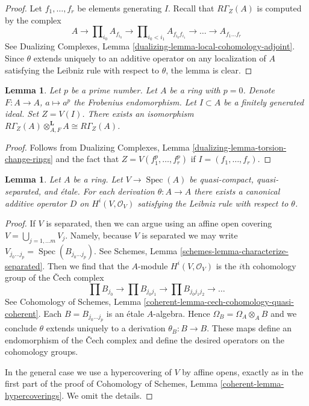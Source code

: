 \documentclass{stacks-project}
\theoremstyle{plain}
\newtheorem{lemma}[subsection]{Lemma}
\theoremstyle{definition}
\theoremstyle{remark}
\numberwithin{equation}{subsection}
\def\Spec{\mathop{\mathrm{Spec}}}
\begin{document}
\begin{proof}
Let $f_1, \ldots, f_r$ be elements generating $I$.
Recall that $R\Gamma_Z(A)$ is computed by the complex
$$
A \to \prod\nolimits_{i_0} A_{f_{i_0}} \to
\prod\nolimits_{i_0 < i_1} A_{f_{i_0}f_{i_1}}
\to \ldots \to A_{f_1\ldots f_r}
$$
See Dualizing Complexes, Lemma \ref{dualizing-lemma-local-cohomology-adjoint}.
Since $\theta$ extends uniquely to an additive operator on
any localization of $A$ satisfying the Leibniz rule with
respect to $\theta$, the lemma is clear.
\end{proof}

\begin{lemma}
\label{lemma-frobenius}
Let $p$ be a prime number. Let $A$ be a ring with $p = 0$.
Denote $F : A \to A$, $a \mapsto a^p$ the Frobenius endomorphism.
Let $I \subset A$ be a finitely generated ideal. Set $Z = V(I)$.
There exists an isomorphism
$R\Gamma_Z(A) \otimes_{A, F}^\mathbf{L} A \cong R\Gamma_Z(A)$.
\end{lemma}

\begin{proof}
Follows from Dualizing Complexes, Lemma
\ref{dualizing-lemma-torsion-change-rings}
and the fact that $Z = V(f_1^p, \ldots, f_r^p)$
if $I = (f_1, \ldots, f_r)$.
\end{proof}

\begin{lemma}
\label{lemma-etale-derivation}
Let $A$ be a ring. Let $V \to \Spec(A)$ be quasi-compact, quasi-separated,
and \'etale. For each derivation $\theta : A \to A$ there exists a canonical
additive operator $D$ on $H^i(V, \mathcal{O}_V)$
satisfying the Leibniz rule with respect to $\theta$.
\end{lemma}

\begin{proof}
If $V$ is separated, then we can argue using an affine open covering
$V = \bigcup_{j = 1, \ldots m} V_j$. Namely, because $V$ is separated
we may write $V_{j_0 \ldots j_p} = \Spec(B_{j_0 \ldots j_p})$.
See Schemes, Lemma \ref{schemes-lemma-characterize-separated}. Then we
find that the $A$-module $H^i(V, \mathcal{O}_V)$
is the $i$th cohomology group of the {\v C}ech complex
$$
\prod B_{j_0} \to
\prod B_{j_0j_1} \to
\prod B_{j_0j_1j_2} \to \ldots
$$
See Cohomology of Schemes, Lemma
\ref{coherent-lemma-cech-cohomology-quasi-coherent}.
Each $B = B_{j_0 \ldots j_p}$ is an \'etale $A$-algebra.
Hence $\Omega_B = \Omega_A \otimes_A B$ and we conclude
$\theta$ extends uniquely to a derivation $\theta_B : B \to B$.
These maps define an endomorphism of the {\v C}ech complex
and define the desired operators on the cohomology groups.

\medskip\noindent
In the general case we use a hypercovering of $V$ by
affine opens, exactly as in the first part of the proof of
Cohomology of Schemes, Lemma \ref{coherent-lemma-hypercoverings}.
We omit the details.
\end{proof}
\end{document}
